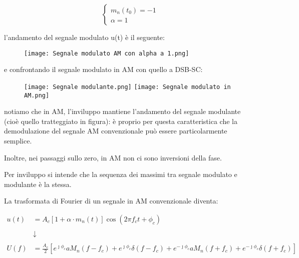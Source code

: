 {
    \Large 
    \begin{equation}
        \begin{cases}
            m_n(t_0) = - 1 
            \\
            \alpha = 1
        \end{cases}
    \end{equation}
}

\newpage 

l'andamento del segnale modulato u(t) è il seguente: 

\begin{figure}[h]
    \centering
    \texttt{[image: Segnale modulato AM con alpha a 1.png]}
\end{figure} 

e confrontando il segnale modulato in AM con quello a DSB-SC: 

\begin{figure}[h]
    \centering
    \texttt{[image: Segnale modulante.png]}
    \texttt{[image: Segnale modulato in AM.png]}
\end{figure}

notiamo che in AM, l'inviluppo mantiene l'andamento del segnale modulante (cioè quello tratteggiato in figura): 
è proprio per questa caratteristica che la demodulazione del segnale AM convenzionale può essere particolarmente semplice. \newline 

Inoltre, nei passaggi sullo zero, in AM non ci sono inversioni della fase. \newline 

Per inviluppo si intende che la sequenza dei massimi tra segnale modulato e modulante è la stessa. \newline 

La trasformata di Fourier di un segnale in AM convenzionale diventa: 

{
    \Large 
    \begin{equation}
        \begin{split}
        u (t)
        &= 
        A_c 
        [1 + \alpha \cdot m_n (t)] 
        \cos(2 \pi f_c t + \phi_c)
        \\
        &\quad
        \\
        &\downarrow
        \\
        &\quad
        \\
        U(f)
        &= 
        \frac{A_c}{2}
        \left[
            e^{\jmath \phi_c} a M_n (f - f_c)
            +
            e^{\jmath \phi_c} \delta (f - f_c)
            +
            e^{-\jmath \phi_c} a M_n (f + f_c)
            +
            e^{-\jmath \phi_c} \delta (f + f_c)
        \right]
    \end{split}
    \end{equation}
}


